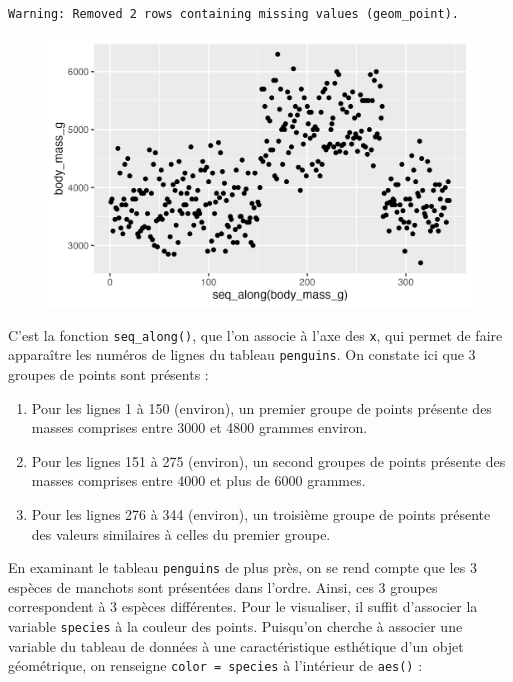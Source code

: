 \documentclass[
  letterpaper,
  DIV=11,
  numbers=noendperiod]{scrreprt}
\providecommand{\tightlist}{%
  \setlength{\itemsep}{0pt}\setlength{\parskip}{0pt}}\usepackage{longtable,booktabs,array}
\begin{document}
\begin{verbatim}
Warning: Removed 2 rows containing missing values (geom_point).
\end{verbatim}

\begin{figure}[H]

{\centering \includegraphics{./03-visualization_files/figure-pdf/unnamed-chunk-26-1.png}

}

\end{figure}

C'est la fonction \texttt{seq\_along()}, que l'on associe à l'axe des
\texttt{x}, qui permet de faire apparaître les numéros de lignes du
tableau \texttt{penguins}. On constate ici que 3 groupes de points sont
présents :

\begin{enumerate}
\def\labelenumi{\arabic{enumi}.}
\tightlist
\item
  Pour les lignes 1 à 150 (environ), un premier groupe de points
  présente des masses comprises entre 3000 et 4800 grammes environ.
\item
  Pour les lignes 151 à 275 (environ), un second groupes de points
  présente des masses comprises entre 4000 et plus de 6000 grammes.
\item
  Pour les lignes 276 à 344 (environ), un troisième groupe de points
  présente des valeurs similaires à celles du premier groupe.
\end{enumerate}

En examinant le tableau \texttt{penguins} de plus près, on se rend
compte que les 3 espèces de manchots sont présentées dans l'ordre.
Ainsi, ces 3 groupes correspondent à 3 espèces différentes. Pour le
visualiser, il suffit d'associer la variable \texttt{species} à la
couleur des points. Puisqu'on cherche à associer une variable du tableau
de données à une caractéristique esthétique d'un objet géométrique, on
renseigne \texttt{color\ =\ species} à l'intérieur de \texttt{aes()} :
\end{document}
